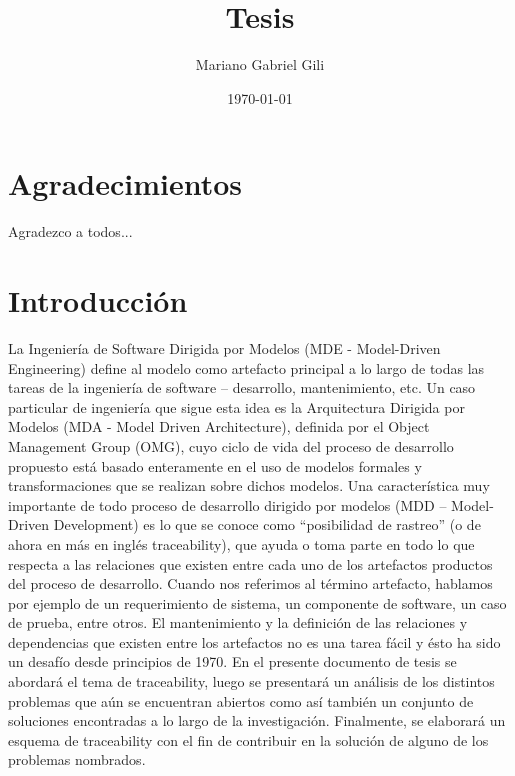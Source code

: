 \documentclass[a4paper,12pt,oneside]{book}
\author{Mariano Gabriel Gili}
\title{Tesis}
\date{\today}
\begin{document}
 \maketitle

\frontmatter
\tableofcontents
\listoffigures


\chapter{Agradecimientos}


Agradezco a todos...


\chapter{Introducción}


La Ingeniería de Software Dirigida por Modelos (MDE - Model-Driven Engineering) define al modelo como artefacto principal a lo largo de todas las tareas de la ingeniería de software – desarrollo, mantenimiento, etc. Un caso particular de ingeniería que sigue esta idea es la Arquitectura Dirigida por Modelos (MDA - Model Driven Architecture), definida por el Object Management Group (OMG), cuyo ciclo de vida del proceso de desarrollo propuesto está basado enteramente en el uso de modelos formales y transformaciones que se realizan sobre dichos modelos. Una característica muy importante de todo proceso de desarrollo dirigido por modelos (MDD – Model-Driven Development) es lo que se conoce como “posibilidad de rastreo” (o de ahora en más en inglés traceability), que ayuda o toma parte en todo lo que respecta a las relaciones que existen entre cada uno de los artefactos productos del proceso de desarrollo. Cuando nos referimos al término artefacto, hablamos por ejemplo de un requerimiento de sistema, un componente de software, un caso de prueba, entre otros. El mantenimiento y la definición de las relaciones y dependencias que existen entre los artefactos no es una tarea fácil y ésto ha sido un desafío desde principios de 1970.
En el presente documento de tesis se abordará el tema de traceability, luego se presentará un análisis de los distintos problemas que aún se encuentran abiertos como así también un conjunto de soluciones encontradas a lo largo de la investigación. Finalmente, se elaborará un esquema de traceability con el fin de contribuir en la solución de alguno de los problemas nombrados.
\end{document}
